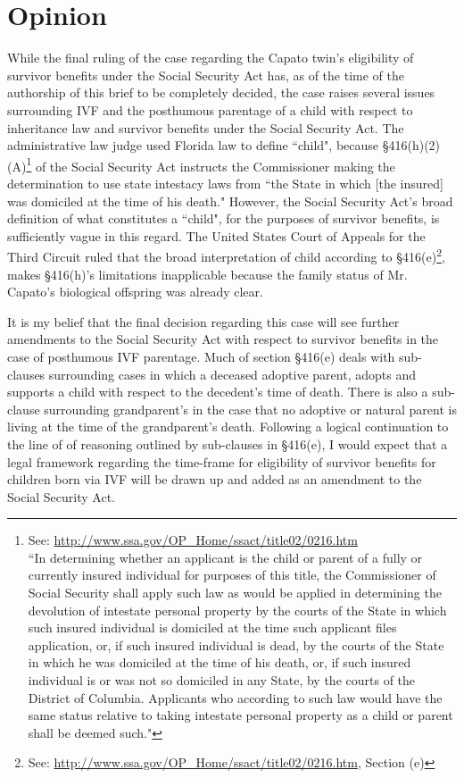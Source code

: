 \documentclass[letterpaper,10pt,twoside]{article}
\begin{document}
\section*{Opinion}
While the final ruling of the case regarding the Capato twin's eligibility of survivor benefits under the Social Security Act has, as of the time of the authorship of this brief to be completely decided, the case raises several issues surrounding IVF and the posthumous parentage of a child with respect to inheritance law and survivor benefits under the Social Security Act. The administrative law judge used Florida law to define ``child", because \S 416(h)(2)(A)\footnote{See: \url{http://www.ssa.gov/OP_Home/ssact/title02/0216.htm}\\``In determining whether an applicant is the child or parent of a fully or currently insured individual for purposes of this title, the Commissioner of Social Security shall apply such law as would be applied in determining the devolution of intestate personal property by the courts of the State in which such insured individual is domiciled at the time such applicant files application, or, if such insured individual is dead, by the courts of the State in which he was domiciled at the time of his death, or, if such insured individual is or was not so domiciled in any State, by the courts of the District of Columbia. Applicants who according to such law would have the same status relative to taking intestate personal property as a child or parent shall be deemed such."} of the Social Security Act instructs the Commissioner making the determination to use state intestacy laws from ``the State in which [the insured] was domiciled at the time of his death."  However, the Social Security Act's broad definition of what constitutes a ``child", for the purposes of survivor benefits, is sufficiently vague in this regard.  The United States Court of Appeals for the Third Circuit ruled that the broad interpretation of child according to \S 416(e)\footnote{See: \url{http://www.ssa.gov/OP_Home/ssact/title02/0216.htm}, Section (e)}, makes \S 416(h)'s limitations inapplicable because the family status of Mr. Capato's biological offspring was already clear.

It is my belief that the final  decision regarding this case will see further amendments to the Social Security Act with respect to survivor benefits in the case of posthumous IVF parentage.  Much of section \S 416(e) deals with sub-clauses surrounding cases in which a deceased adoptive parent, adopts and supports a child with respect to the decedent's time of death.  There is also a sub-clause surrounding grandparent's in the case that no adoptive or natural parent is living at the time of the grandparent's death.  Following a logical continuation to the line of of reasoning outlined by sub-clauses in \S 416(e), I would expect that a legal framework regarding the time-frame for eligibility of survivor benefits for children born via IVF will be drawn up and added as an amendment to the Social Security Act.
\end{document}
